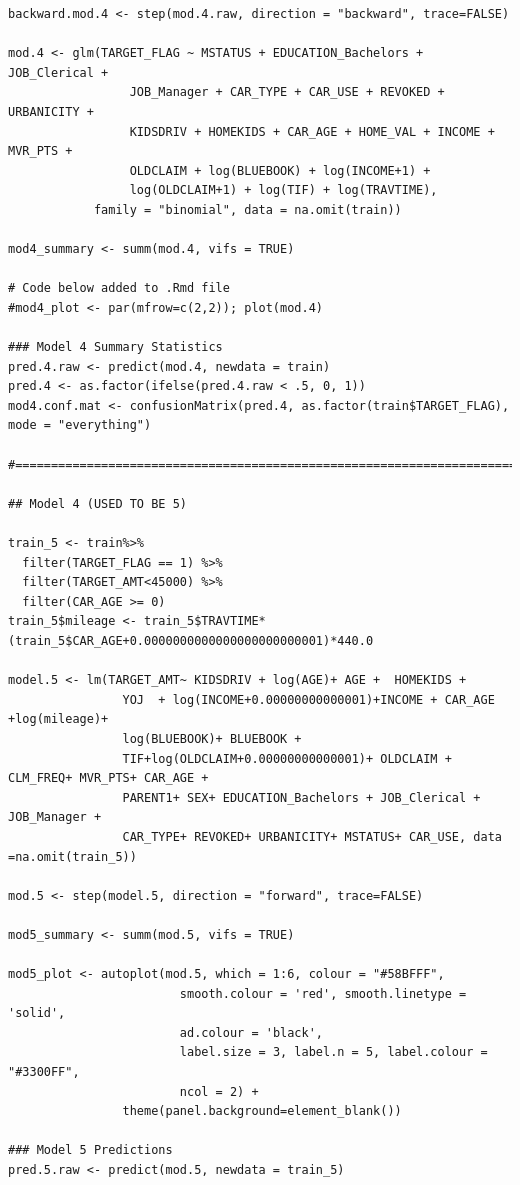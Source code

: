 \documentclass[]{article}
\begin{document}
\begin{verbatim}
backward.mod.4 <- step(mod.4.raw, direction = "backward", trace=FALSE)

mod.4 <- glm(TARGET_FLAG ~ MSTATUS + EDUCATION_Bachelors + JOB_Clerical + 
                 JOB_Manager + CAR_TYPE + CAR_USE + REVOKED + URBANICITY + 
                 KIDSDRIV + HOMEKIDS + CAR_AGE + HOME_VAL + INCOME + MVR_PTS + 
                 OLDCLAIM + log(BLUEBOOK) + log(INCOME+1) + 
                 log(OLDCLAIM+1) + log(TIF) + log(TRAVTIME),
            family = "binomial", data = na.omit(train))

mod4_summary <- summ(mod.4, vifs = TRUE)

# Code below added to .Rmd file
#mod4_plot <- par(mfrow=c(2,2)); plot(mod.4)

### Model 4 Summary Statistics
pred.4.raw <- predict(mod.4, newdata = train)
pred.4 <- as.factor(ifelse(pred.4.raw < .5, 0, 1))
mod4.conf.mat <- confusionMatrix(pred.4, as.factor(train$TARGET_FLAG), mode = "everything")

#==============================================================================#

## Model 4 (USED TO BE 5)

train_5 <- train%>%
  filter(TARGET_FLAG == 1) %>%
  filter(TARGET_AMT<45000) %>%
  filter(CAR_AGE >= 0)
train_5$mileage <- train_5$TRAVTIME*(train_5$CAR_AGE+0.0000000000000000000000001)*440.0

model.5 <- lm(TARGET_AMT~ KIDSDRIV + log(AGE)+ AGE +  HOMEKIDS +
                YOJ  + log(INCOME+0.00000000000001)+INCOME + CAR_AGE +log(mileage)+  
                log(BLUEBOOK)+ BLUEBOOK +
                TIF+log(OLDCLAIM+0.00000000000001)+ OLDCLAIM + CLM_FREQ+ MVR_PTS+ CAR_AGE +
                PARENT1+ SEX+ EDUCATION_Bachelors + JOB_Clerical + JOB_Manager + 
                CAR_TYPE+ REVOKED+ URBANICITY+ MSTATUS+ CAR_USE, data =na.omit(train_5))

mod.5 <- step(model.5, direction = "forward", trace=FALSE)

mod5_summary <- summ(mod.5, vifs = TRUE)

mod5_plot <- autoplot(mod.5, which = 1:6, colour = "#58BFFF",
                        smooth.colour = 'red', smooth.linetype = 'solid',
                        ad.colour = 'black',
                        label.size = 3, label.n = 5, label.colour = "#3300FF",
                        ncol = 2) +
                theme(panel.background=element_blank())

### Model 5 Predictions
pred.5.raw <- predict(mod.5, newdata = train_5)


\end{verbatim}
\end{document}
